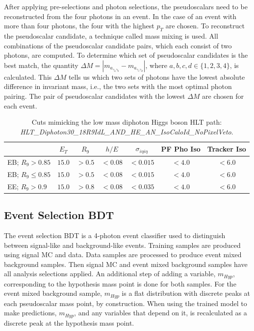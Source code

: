 \documentclass[12pt]{article}
\begin{document}
After applying pre-selections and photon selections, the pseudoscalars need to be reconstructed from the four photons in an event. In the case of an event with more than four photons, the four with the highest $p_T$ are chosen. To reconstruct the pseudoscalar candidate, a technique called mass mixing is used. All combinations of the pseudoscalar candidate pairs, which each consist of two photons, are computed. To determine which set of pseudoscalar candidates is the best match, the quantity $\Delta M = |m_{a_{\gamma_{a} \gamma_{b}}} - m_{a_{\gamma_{c} \gamma_{d}}}|$, where $a,b,c,d \in \{1,2,3,4\}$, is calculated. This $\Delta M$ tells us which two sets of photons have the lowest absolute difference in invariant mass, i.e., the two sets with the most optimal photon pairing. The pair of pseudoscalar candidates with the lowest $\Delta M$ are chosen for each event.\par

\begin{table}
   \centering
   \begin{tabular}{l|c|c|c|c|c|c}
        & $E_T$ & $R_9$ & $h/E$ & $\sigma_{i\eta i\eta}$ & PF Pho Iso & Tracker Iso\\ \hline
       EB; $R_9>0.85$ & $15.0$ & $> 0.5$ & $<0.08$ & $<0.015$ & $<4.0$ & $<6.0$\\
       EB; $R_9\leq0.85$ & $15.0$ & $> 0.5$ & $<0.08$ & $<0.015$ & $<4.0$ & $<6.0$\\
       EE; $R_9>0.9$ & $15.0$ & $> 0.8$ & $<0.08$ & $<0.035$ & $<4.0$ & $<6.0$
   \end{tabular}
   \caption{Cuts mimicking the low mass diphoton Higgs boson HLT path:\\ \textit{HLT\_Diphoton30\_18R9IdL\_AND\_HE\_AN\_IsoCaloId\_NoPixelVeto}.}
   \label{tab:hlt_cuts_2018}
\end{table}

\subsection{Event Selection BDT}
The event selection BDT is a 4-photon event classifier used to distinguish between signal-like and background-like events. Training samples are produced using signal MC and data. Data samples are processed to produce event mixed background samples. Then signal MC and event mixed background samples have all analysis selections applied. An additional step of adding a variable, $m_{Hyp}$, corresponding to the hypothesis mass point is done for both samples. For the event mixed background sample, $m_{Hyp}$ is a flat distribution with discrete peaks at each pseudoscalar mass point, by construction. When using the trained model to make predictions, $m_{Hyp}$, and any variables that depend on it, is recalculated as a discrete peak at the hypothesis mass point.\par
\end{document}
